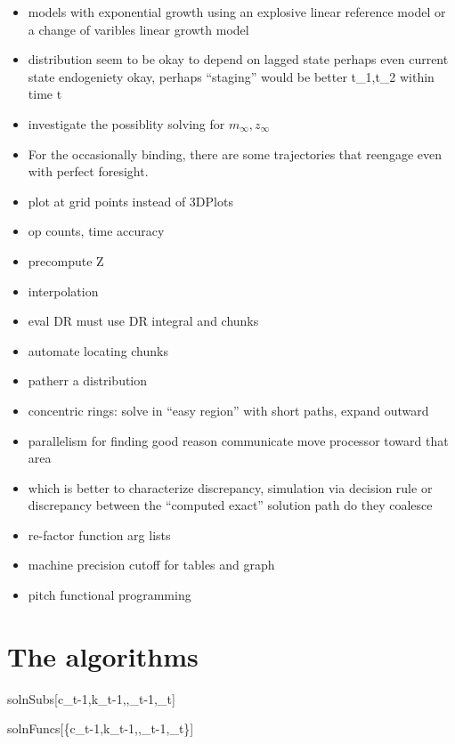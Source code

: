 \documentclass[12pt]{article}
\begin{document}
\begin{itemize}
\item models with exponential growth using an explosive linear reference model or a change of varibles linear growth model
\item distribution seem to be okay to depend on lagged state perhaps even current state endogeniety okay, perhaps ``staging'' would be better t_1,t_2 within time t
\item investigate the possiblity solving for $m_\infty,z_\infty$
\item For the occasionally binding, there are some trajectories that reengage even
with perfect foresight.
\item plot at grid points instead of 3DPlots
\item op counts, time accuracy
\item precompute Z
\item interpolation
\item eval DR must use DR integral and chunks
\item automate locating chunks
\item patherr a distribution
\item concentric rings: solve in ``easy region'' with short paths, expand outward
\item parallelism for finding good reason communicate move processor toward that area
\item which is better to characterize discrepancy, simulation via decision rule or discrepancy between the ``computed exact'' solution path  do they coalesce
\item re-factor function arg lists
\item machine precision cutoff for tables and graph
\item pitch functional programming
\end{itemize}
\section{The algorithms}
\label{sec:algorithms}

\begin{pseudocode}{solnSubs}{[c_{t-1},k_{t-1},,\theta_{t-1},\epsilon_t]}
\end{pseudocode}


\begin{pseudocode}{solnFuncs}{[\{c_{t-1},k_{t-1},,\theta_{t-1},\epsilon_t\}]}
\end{pseudocode}
\end{document}
